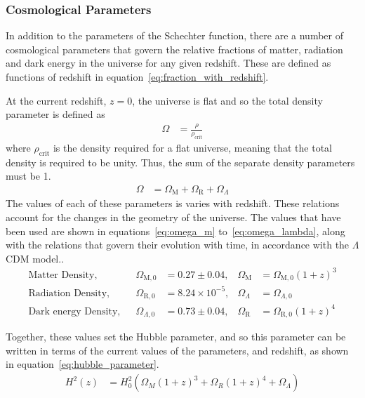 	\subsubsection{Cosmological Parameters} %
	\label{ssub:cosmological_parameters}
		In addition to the parameters of the Schechter function, there are a number of cosmological parameters that govern the relative fractions of matter, radiation and dark energy in the universe for any given redshift. These are defined as functions of redshift in equation~\ref{eq:fraction_with_redshift}.

		At the current redshift, $z=0$, the universe is flat and so the total density parameter is defined as
		\begin{align}
			\Omega &= \frac{\rho}{\rho_{\text{crit}}}
		\end{align}
		where $\rho_{\text{crit}}$ is the density required for a flat universe, meaning that the total density is required to be unity. Thus, the sum of the separate density parameters must be 1.
		\begin{align}
			\Omega &= \Omega_\text{M} + \Omega_\text{R} + \Omega_\Lambda \label{eq:fraction_with_redshift}
		\end{align}
		The values of each of these parameters is varies with redshift. These relations account for the changes in the geometry of the universe. The values that have been used are shown in equations~\ref{eq:omega_m} to~\ref{eq:omega_lambda}, along with the relations that govern their evolution with time, in accordance with the $\Lambda$CDM model.\cite{WMAP_Observations_Cosmological_Interpretation}.
		\begin{align}
			\text{Matter Density}, 		&& \Omega_{\text{M},0} 	&= 0.27\pm 0.04,			& \Omega_\text{M} &= \Omega_{\text{M},0}(1+z)^3 \label{eq:omega_m}\\
			\text{Radiation Density}, 	&& \Omega_{\text{R},0}	&= 8.24\times 10^{-5}, 	& \Omega_\Lambda  &= \Omega_{\Lambda,0} \label{eq:omega_r}\\
			\text{Dark energy Density}, 	&& \Omega_{\Lambda,0} 	&= 0.73\pm 0.04,			& \Omega_\text{R} &= \Omega_{\text{R},0}(1+z)^4 \label{eq:omega_lambda}
		\end{align}

		Together, these values set the Hubble parameter, and so this parameter can be written in terms of the current values of the parameters, and redshift, as shown in equation~\ref{eq:hubble_parameter}\cite{hubble_parameter_astro_journal}.
		\begin{align}
	        H^2(z) &= H_0^2\left( \Omega_M {(1+z)}^3 + \Omega_R {(1+z)}^4 + \Omega_{\Lambda} \right) \label{eq:hubble_parameter}
    	\end{align}

